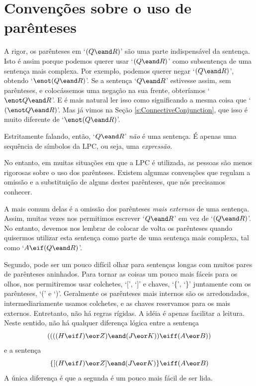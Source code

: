 \section{Convenções sobre o uso de parênteses}
\label{TFLconventions}
A rigor, os parênteses em `$(Q \eand R)$' são uma parte indispensável da sentença.
Isto é assim porque podemos querer usar `$(Q \eand R)$' como subsentença de uma sentença mais complexa.
Por exemplo, podemos querer negar `$(Q \eand R)$', obtendo `$\enot(Q \eand R)$'.
Se a sentença `$Q \eand R$' estivesse assim, sem parênteses, e colocássemos uma negação na sua frente, obteríamos `$\enot Q \eand R$'.
E é mais natural ler isso como significando a mesma coisa que `$(\enot Q \eand R)$'.
Mas já vimos na Seção \ref{s:ConnectiveConjunction}, que isso é muito diferente de `$\enot(Q \eand R)$'.

Estritamente falando, então, `$Q \eand R$' \emph{não} é uma sentença.
É apenas uma sequência de símbolos da LPC, ou seja, uma \emph{expressão}.

No entanto, em muitas situações em que a LPC é utilizada, as pessoas são menos rigorosas sobre o uso dos parênteses.
Existem algumas convenções que regulam a omissão e a substituição de alguns destes parênteses, que nós precisamos conhecer.

A mais comum delas é a omissão dos parênteses \emph{mais externos} de uma sentença.
Assim, muitas vezes nos permitimos escrever `$Q \eand R$' em vez de `$(Q \eand R)$'.
No entanto, devemos nos lembrar de colocar de volta os parênteses quando quisermos utilizar esta sentença como parte de uma sentença mais complexa, tal como `$A \eif (Q \eand R)$'.

Segundo, pode ser um pouco difícil olhar para sentenças longas com muitos pares de parênteses aninhados.
Para tornar as coisas um pouco mais fáceis para os olhos, nos permitiremos usar colchetes, `[', `]' e chaves, `\{', `\}' juntamente com os parênteses, `(' e `)'.
Geralmente os parênteses mais internos são os arredondados, intermediariamente usamos colchetes, e as chaves reservamos para os mais externos.
Entretanto, não há regras rígidas.
A idéia é apenas facilitar a leitura.
Neste sentido, não há qualquer diferença lógica entre a sentença
$$((((H \eif I) \eor Z) \eand (J \eor K)) \eiff (A \eor B))$$
e a sentença
$$\{[(H \eif I) \eor Z] \eand (J \eor K)\} \eiff (A \eor B)$$
A única diferença é que a segunda é um pouco mais fácil de ser lida.


\practiceproblems

